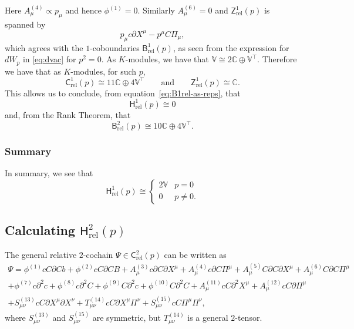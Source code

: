 \documentclass[11pt,reqno,a4paper,final]{amsart}
\theoremstyle{plain}
\theoremstyle{definition}
\renewcommand{\d}{\partial}
\newcommand{\Crel}{\mathsf{C}_{\mathrm{rel}}} %
\newcommand{\Hrel}{\mathsf{H}_{\mathrm{rel}}}
\newcommand{\Brel}{\mathsf{B}_{\mathrm{rel}}}
\newcommand{\Zrel}{\mathsf{Z}_{\mathrm{rel}}}
\newcommand{\VV}{\mathbb{V}}
\newcommand{\CC}{\mathbb{C}}
\newcommand{\1}{\mathbb{1}}
\numberwithin{equation}{section}
\begin{document}
Here $A^{(4)}_\mu \propto p_\mu$ and hence $\phi^{(1)} =0$.  Similarly
$A^{(6)}_\mu = 0$ and $\Zrel^1(p)$ is spanned by
\begin{equation}
  p_\mu c \d X^\mu - p^\mu C \Pi_\mu,
\end{equation}
which agrees with the $1$-coboundaries $\Brel^1(p)$, as seen from the
expression for $dW_p$ in \eqref{eq:dvac} for $p^2 = 0$.  As
$K$-modules, we have that $\VV \cong 2\CC \oplus \VV^\top$.  Therefore
we have that as $K$-modules, for such $p$,
\begin{equation}
  \Crel^1(p) \cong 11 \CC \oplus 4 \VV^\top \qquad\text{and}\qquad
  \Zrel^1(p) \cong \CC.
\end{equation}
This allows us to conclude, from equation~\eqref{eq:B1rel-as-reps},
that
\begin{equation}
  \Hrel^1(p) \cong 0
\end{equation}
and, from the Rank Theorem, that
\begin{equation}
  \Brel^2(p) \cong 10 \CC \oplus 4 \VV^\top.
\end{equation}

\subsubsection{Summary}
\label{sec:hrel1-summary}

In summary, we see that
\begin{equation}
  \Hrel^1(p) \cong
  \begin{cases}
    2 \VV & p = 0\\
    0 & p \neq 0.
  \end{cases}
\end{equation}

\subsection{Calculating $\Hrel^2(p)$}
\label{sec:calculating-hrel2p}

The general relative $2$-cochain $\Psi \in \Crel^2(p)$ can be written as
\begin{multline}
  \Psi = \phi^{(1)} c C \d C  b + \phi^{(2)} c C \d C B + A^{(3)}_\mu c \d C \d X^\mu + A^{(4)}_\mu c \d C \Pi^\mu + A^{(5)}_\mu C \d C \d X^\mu + A^{(6)}_\mu C \d C \Pi^\mu\\
  + \phi^{(7)} c \d^2 c + \phi^{(8)} c \d^2 C + \phi^{(9)} C \d^2  c + \phi^{(10)} C \d^2 C + A^{(11)}_\mu c C \d^2 X^\mu + A^{(12)}_\mu c C \d \Pi^\mu\\
  + S^{(13)}_{\mu\nu} c C \d X^\mu \d X^\nu + T^{(14)}_{\mu\nu} c C \d X^\mu \Pi^\nu + S^{(15)}_{\mu\nu} c C \Pi^\mu \Pi^\nu,
\end{multline}
where $S^{(13)}_{\mu\nu}$ and $S^{(15)}_{\mu\nu}$ are symmetric, but $T^{(14)}_{\mu\nu}$ is a general $2$-tensor.
\end{document}
